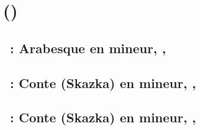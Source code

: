 \chapter[%
Nikolaj Metner (\Dates{1880-01-05}{1951-11-13})][%
Nikolaj Metner]{%
\NMedtner{} ()}
\label{chap:Medtner}

\section{\ifChrono \Medtner{}~: \fi
Arabesque en \kB mineur,  , }
\label{\thesection}

\begin{workitemize}
 \item{}
 \begin{perfitemize}
  \item{}
 \end{perfitemize}
\end{workitemize}

\section{\ifChrono \Medtner{}~: \fi
Conte (Skazka) en \kE mineur,  , }
\label{\thesection}

\begin{workitemize}
 \item{}
 \begin{perfitemize}
  \item{}
 \end{perfitemize}
\end{workitemize}

\section{\ifChrono \Medtner{}~: \fi
Conte (Skazka) en \kB mineur,  , }
\label{\thesection}

